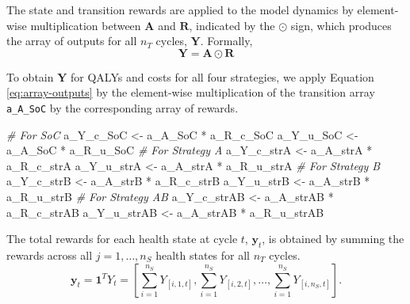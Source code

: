 \documentclass[
]{article}
\newenvironment{Shaded}{\begin{snugshade}}{\end{snugshade}}
\newcommand{\CommentTok}[1]{\textcolor[rgb]{0.56,0.35,0.01}{\textit{#1}}}
\newcommand{\NormalTok}[1]{#1}
\newcommand{\OtherTok}[1]{\textcolor[rgb]{0.56,0.35,0.01}{#1}}
\newcommand{\SpecialCharTok}[1]{\textcolor[rgb]{0.00,0.00,0.00}{#1}}
\begin{document}
The state and transition rewards are applied to the model dynamics by element-wise multiplication between \(\mathbf{A}\) and \(\mathbf{R}\), indicated by the \(\odot\) sign, which produces the array of outputs for all \(n_T\) cycles, \(\mathbf{Y}\). Formally,
\begin{equation}
  \mathbf{Y} = \mathbf{A} \odot \mathbf{R}
  \label{eq:array-outputs}
\end{equation}

To obtain \(\mathbf{Y}\) for QALYs and costs for all four strategies, we apply Equation \eqref{eq:array-outputs} by the element-wise multiplication of the transition array \texttt{a\_A\_SoC} by the corresponding array of rewards.

\begin{Shaded}
\begin{Highlighting}[]
\CommentTok{\# For SoC}
\NormalTok{a\_Y\_c\_SoC }\OtherTok{\textless{}{-}}\NormalTok{ a\_A\_SoC }\SpecialCharTok{*}\NormalTok{ a\_R\_c\_SoC}
\NormalTok{a\_Y\_u\_SoC }\OtherTok{\textless{}{-}}\NormalTok{ a\_A\_SoC }\SpecialCharTok{*}\NormalTok{ a\_R\_u\_SoC}
\CommentTok{\# For Strategy A}
\NormalTok{a\_Y\_c\_strA }\OtherTok{\textless{}{-}}\NormalTok{ a\_A\_strA }\SpecialCharTok{*}\NormalTok{ a\_R\_c\_strA}
\NormalTok{a\_Y\_u\_strA }\OtherTok{\textless{}{-}}\NormalTok{ a\_A\_strA }\SpecialCharTok{*}\NormalTok{ a\_R\_u\_strA}
\CommentTok{\# For Strategy B}
\NormalTok{a\_Y\_c\_strB }\OtherTok{\textless{}{-}}\NormalTok{ a\_A\_strB }\SpecialCharTok{*}\NormalTok{ a\_R\_c\_strB}
\NormalTok{a\_Y\_u\_strB }\OtherTok{\textless{}{-}}\NormalTok{ a\_A\_strB }\SpecialCharTok{*}\NormalTok{ a\_R\_u\_strB}
\CommentTok{\# For Strategy AB}
\NormalTok{a\_Y\_c\_strAB }\OtherTok{\textless{}{-}}\NormalTok{ a\_A\_strAB }\SpecialCharTok{*}\NormalTok{ a\_R\_c\_strAB}
\NormalTok{a\_Y\_u\_strAB }\OtherTok{\textless{}{-}}\NormalTok{ a\_A\_strAB }\SpecialCharTok{*}\NormalTok{ a\_R\_u\_strAB}
\end{Highlighting}
\end{Shaded}

The total rewards for each health state at cycle \(t\), \(\mathbf{y}_t\), is obtained by summing the rewards across all \(j = 1,\ldots, n_S\) health states for all \(n_T\) cycles.
\begin{equation}
  \mathbf{y}_t = \mathbf{1}^T Y_t = \left[\sum_{i=1}^{n_S}{Y_{[i,1,t]}}, \sum_{i=1}^{n_S}{Y_{[i,2,t]}}, \dots , \sum_{i=1}^{n_S}{Y_{[i,n_S,t]}}\right].
  \label{eq:exp-rewd-trans}
\end{equation}
\end{document}
